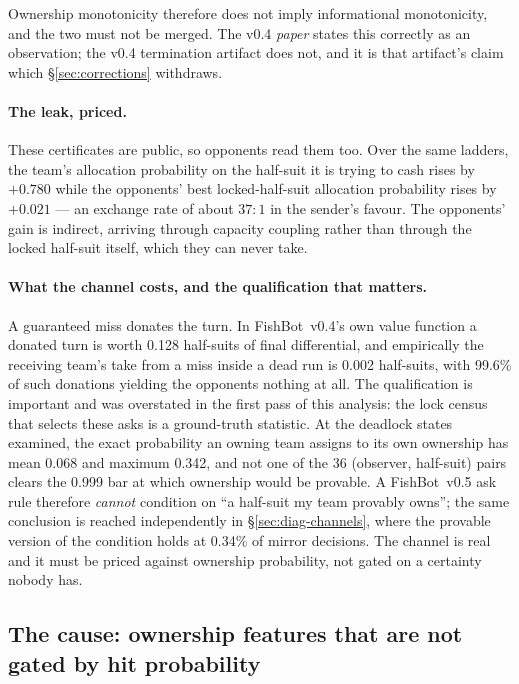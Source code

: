 \documentclass[11pt]{article}
\theoremstyle{definition}
\DeclareRobustCommand{\vfive}{\texorpdfstring{\mbox{FishBot v0.5}}{FishBot v0.5}}
\DeclareRobustCommand{\vfour}{\texorpdfstring{\mbox{FishBot v0.4}}{FishBot v0.4}}
\providecommand{\numTeamGain}{0.780}
\providecommand{\numOppGain}{0.021}
\providecommand{\numLeakRatio}{37}
\providecommand{\numDonationCost}{0.128}
\providecommand{\numDonationDead}{0.002}
\providecommand{\numDonationNil}{99.6}
\providecommand{\numOwnProbPairs}{36}
\providecommand{\numOwnProbMean}{0.068}
\providecommand{\numOwnProbMax}{0.342}
\providecommand{\numProvableThresh}{0.999}
\providecommand{\numProvableOwn}{0.34}
\begin{document}
Ownership monotonicity therefore does not imply informational monotonicity, and
the two must not be merged. The v0.4 \emph{paper} states this correctly as an
observation; the v0.4 termination artifact does not, and it is that artifact's
claim which \S\ref{sec:corrections} withdraws.

\paragraph{The leak, priced.} These certificates are public, so opponents read
them too. Over the same ladders, the team's allocation probability on the
half-suit it is trying to cash rises by $+\numTeamGain$ while the opponents' best
locked-half-suit allocation probability rises by $+\numOppGain$ --- an exchange
rate of about $\numLeakRatio\!:\!1$ in the sender's favour. The opponents' gain
is indirect, arriving through capacity coupling rather than through the locked
half-suit itself, which they can never take.

\paragraph{What the channel costs, and the qualification that matters.} A
guaranteed miss donates the turn. In \vfour{}'s own value function a donated turn
is worth \numDonationCost{} half-suits of final differential, and empirically the
receiving team's take from a miss inside a dead run is \numDonationDead{}
half-suits, with \numDonationNil\% of such donations yielding the opponents
nothing at all.
The qualification is important and was overstated in the first pass of this
analysis: the lock census that selects these asks is a ground-truth statistic. At
the deadlock states examined, the exact probability an owning team assigns to its
own ownership has mean \numOwnProbMean{} and maximum \numOwnProbMax{}, and not
one of the \numOwnProbPairs{} (observer, half-suit) pairs clears the
\numProvableThresh{} bar at which ownership would be provable. A \vfive{} ask rule therefore \emph{cannot} condition on ``a
half-suit my team provably owns''; the same conclusion is reached independently
in \S\ref{sec:diag-channels}, where the provable version of the condition holds
at \numProvableOwn\% of mirror decisions. The channel is real and it must be
priced against ownership probability, not gated on a certainty nobody has.

\subsection{The cause: ownership features that are not gated by hit probability}
\label{sec:diag-features}
\end{document}
